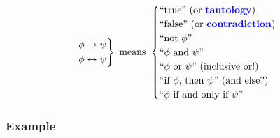 \begin{frame}{\myframetitle}
\begin{mycolumns}
{\begin{equation*}
\begin{rcases}
					\phi \rightarrow \psi \\
					\phi \leftrightarrow \psi
				\end{rcases} \text{ means } \begin{cases}
					\text{``true'' (or {\color{blue}\textbf{tautology}})} \\
					\text{``false'' (or {\color{blue}\textbf{contradiction}})} \\
					\text{``not $\phi$''} \\
					\text{``$\phi$ and $\psi$''} \\
					\text{``$\phi$ or $\psi$'' (inclusive or!)} \\
					\text{``if $\phi$, then $\psi$'' (and else?)} \\
					\text{``$\phi$ if and only if $\psi$''}
				\end{cases}
			\end{equation*}
		}
	\end{mycolumns}
\end{frame}

\subsubsection*{Example}

